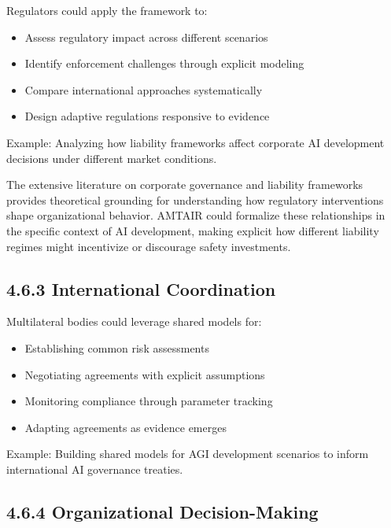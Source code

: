 \documentclass[
  11pt,
  letterpaper,
  openany]{book}
\providecommand{\tightlist}{%
  \setlength{\itemsep}{0pt}\setlength{\parskip}{0pt}}
\begin{document}
Regulators could apply the framework to:

\begin{itemize}
\tightlist
\item
  Assess regulatory impact across different scenarios
\item
  Identify enforcement challenges through explicit modeling
\item
  Compare international approaches systematically
\item
  Design adaptive regulations responsive to evidence
\end{itemize}

Example: Analyzing how liability frameworks affect corporate AI
development decisions under different market conditions.

The extensive literature on corporate governance and liability
frameworks \textcite{cuomo2016} \textcite{demirag2000}
\textcite{devilliers2021} \textcite{divito2022} \textcite{kaur2024}
\textcite{list2011} \textcite{solomon2020} provides theoretical
grounding for understanding how regulatory interventions shape
organizational behavior. AMTAIR could formalize these relationships in
the specific context of AI development, making explicit how different
liability regimes might incentivize or discourage safety investments.

\subsection{4.6.3 International
Coordination}\label{sec-international-integration}

Multilateral bodies could leverage shared models for:

\begin{itemize}
\tightlist
\item
  Establishing common risk assessments
\item
  Negotiating agreements with explicit assumptions
\item
  Monitoring compliance through parameter tracking
\item
  Adapting agreements as evidence emerges
\end{itemize}

Example: Building shared models for AGI development scenarios to inform
international AI governance treaties.

\subsection{4.6.4 Organizational
Decision-Making}\label{sec-organizational-integration}
\end{document}
